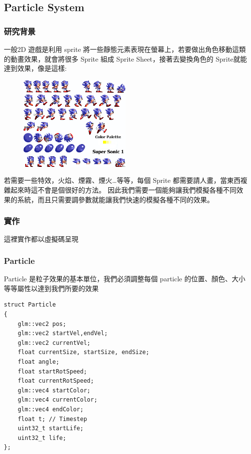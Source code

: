 \subsection{Particle System} %
\label{sub:Particle System}
\subsubsection{研究背景}

一般2D 遊戲是利用 sprite 將一些靜態元素表現在螢幕上，若要做出角色移動這類的動畫效果，就會將很多 Sprite 組成 Sprite Sheet，接著去變換角色的 Sprite就能達到效果，像是這樣:

\begin{figure}[h]
    \begin{center}
    \includegraphics[width=0.5\textwidth]{./resources/particleSystem/example.png}
    \end{center}
\label{fig:particle_1}
\end{figure}

若需要一些特效，火焰、煙霧、煙火…等等，每個 Sprite 都需要請人畫，當東西複雜起來時這不會是個很好的方法。
因此我們需要一個能夠讓我們模擬各種不同效果的系統，而且只需要調參數就能讓我們快速的模擬各種不同的效果。

\subsubsection{實作}
這裡實作都以虛擬碼呈現

\subsubsection{Particle}

Particle 是粒子效果的基本單位，我們必須調整每個 particle 的位置、顏色、大小等等屬性以達到我們所要的效果

\begin{lstlisting}
struct Particle
{
    glm::vec2 pos;
    glm::vec2 startVel,endVel;
    glm::vec2 currentVel;
    float currentSize, startSize, endSize;
    float angle;
    float startRotSpeed;
    float currentRotSpeed;
    glm::vec4 startColor;
    glm::vec4 currentColor;
    glm::vec4 endColor;
    float t; // Timestep
    uint32_t startLife;
    uint32_t life;
};
\end{lstlisting}

